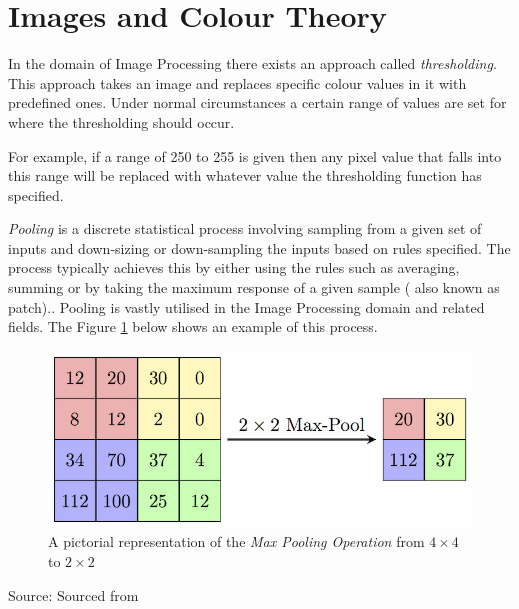 \section{Images and Colour Theory}
\label{sec:col}
In the domain of Image Processing there exists an approach called \textit{thresholding}. This approach takes an image and replaces specific colour values in it with predefined ones. Under normal circumstances a certain range of values are set for where the thresholding should occur.\cite{imgp,shap}

For example, if a range of 250 to 255 is given then any pixel value that falls into this range will be replaced with whatever value the thresholding function has specified.

\textit{Pooling} is a discrete statistical process involving sampling from a given set of inputs and down-sizing or down-sampling the inputs based on rules specified. The process typically achieves this by either using the rules such as averaging, summing or by taking the maximum response of a given sample ( also known as patch).\cite{cnn,pool,murr}. Pooling is vastly utilised in the Image Processing domain and related fields. The Figure \ref{fig:pool} below shows an example of this process.
\begin{figure}[H]
\centering
\includegraphics[width=1\textwidth]{Figures/Chapter3/pool}
\caption{A pictorial representation of the \textit{Max Pooling Operation} from $4 \times 4$ to $2 \times 2$}
\label{fig:pool}
\end{figure}
\begin{center}
Source: Sourced from \cite{pool}
\end{center}